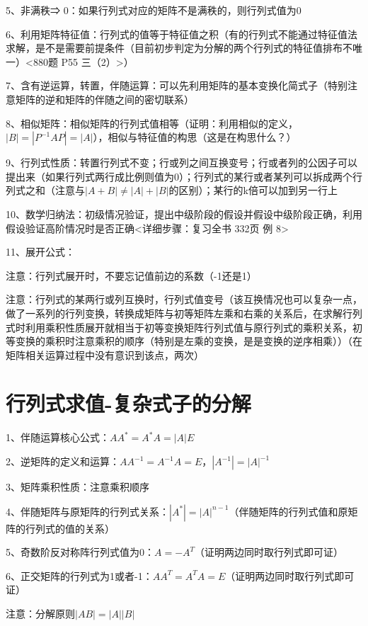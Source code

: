 5、非满秩⇒ 0：如果行列式对应的矩阵不是满秩的，则行列式值为0

6、利用矩阵特征值：行列式的值等于特征值之积（有的行列式不能通过特征值法求解，是不是需要前提条件（目前初步判定为分解的两个行列式的特征值排布不唯一）<880题 P55 三（2）>）

7、含有逆运算，转置，伴随运算：可以先利用矩阵的基本变换化简式子（特别注意矩阵的逆和矩阵的伴随之间的密切联系）

8、相似矩阵：相似矩阵的行列式值相等（证明：利用相似的定义，$|B|=|P^{-1}AP|=|A|$），相似与特征值的构思（这是在构思什么？）

9、行列式性质：转置行列式不变；行或列之间互换变号；行或者列的公因子可以提出来（如果行列式两行成比例则值为0）；行列式的某行或者某列可以拆成两个行列式之和（注意与$|A+B|\ne |A|+|B|$的区别）；某行的k倍可以加到另一行上

10、数学归纳法：初级情况验证，提出中级阶段的假设并假设中级阶段正确，利用假设验证高阶情况时是否正确<详细步骤：复习全书 332页 例 8>

11、展开公式：

注意：行列式展开时，不要忘记值前边的系数（-1还是1）

注意：行列式的某两行或列互换时，行列式值变号（该互换情况也可以复杂一点，做了一系列的行列变换，转换成矩阵与初等矩阵左乘和右乘的关系后，在求解行列式时利用乘积性质展开就相当于初等变换矩阵行列式值与原行列式的乘积关系，初等变换的乘积时注意乘积的顺序（特别是左乘的变换，是是变换的逆序相乘））（在矩阵相关运算过程中没有意识到该点，两次）

\section{行列式求值-复杂式子的分解}

1、伴随运算核心公式：$AA^*=A^*A=|A|E$

2、逆矩阵的定义和运算：$AA^{-1}=A^{-1}A=E$，$|A^{-1}|=|A|^{-1}$

3、矩阵乘积性质：注意乘积顺序

4、伴随矩阵与原矩阵的行列式关系：$|A^*|=|A|^{n-1}$（伴随矩阵的行列式值和原矩阵的行列式的值的关系）

5、奇数阶反对称阵行列式值为0：$A=-A^T$（证明两边同时取行列式即可证）

6、正交矩阵的行列式为1或者-1：$AA^T=A^TA=E$（证明两边同时取行列式即可证）

注意：分解原则$|AB|=|A||B|$

